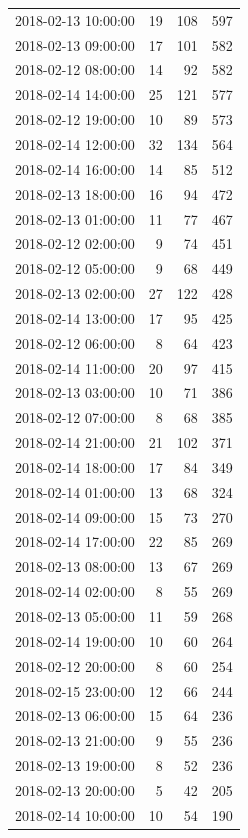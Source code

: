 \begin{tabular}{lrrr}
2018-02-13 10:00:00 & 19 & 108 & 597 \\
2018-02-13 09:00:00 & 17 & 101 & 582 \\
2018-02-12 08:00:00 & 14 & 92 & 582 \\
2018-02-14 14:00:00 & 25 & 121 & 577 \\
2018-02-12 19:00:00 & 10 & 89 & 573 \\
2018-02-14 12:00:00 & 32 & 134 & 564 \\
2018-02-14 16:00:00 & 14 & 85 & 512 \\
2018-02-13 18:00:00 & 16 & 94 & 472 \\
2018-02-13 01:00:00 & 11 & 77 & 467 \\
2018-02-12 02:00:00 & 9 & 74 & 451 \\
2018-02-12 05:00:00 & 9 & 68 & 449 \\
2018-02-13 02:00:00 & 27 & 122 & 428 \\
2018-02-14 13:00:00 & 17 & 95 & 425 \\
2018-02-12 06:00:00 & 8 & 64 & 423 \\
2018-02-14 11:00:00 & 20 & 97 & 415 \\
2018-02-13 03:00:00 & 10 & 71 & 386 \\
2018-02-12 07:00:00 & 8 & 68 & 385 \\
2018-02-14 21:00:00 & 21 & 102 & 371 \\
2018-02-14 18:00:00 & 17 & 84 & 349 \\
2018-02-14 01:00:00 & 13 & 68 & 324 \\
2018-02-14 09:00:00 & 15 & 73 & 270 \\
2018-02-14 17:00:00 & 22 & 85 & 269 \\
2018-02-13 08:00:00 & 13 & 67 & 269 \\
2018-02-14 02:00:00 & 8 & 55 & 269 \\
2018-02-13 05:00:00 & 11 & 59 & 268 \\
2018-02-14 19:00:00 & 10 & 60 & 264 \\
2018-02-12 20:00:00 & 8 & 60 & 254 \\
2018-02-15 23:00:00 & 12 & 66 & 244 \\
2018-02-13 06:00:00 & 15 & 64 & 236 \\
2018-02-13 21:00:00 & 9 & 55 & 236 \\
2018-02-13 19:00:00 & 8 & 52 & 236 \\
2018-02-13 20:00:00 & 5 & 42 & 205 \\
2018-02-14 10:00:00 & 10 & 54 & 190 \\

\end{tabular}
